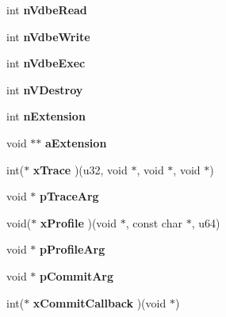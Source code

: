 \begin{DoxyCompactItemize}
\item 
\mbox{\label{structsqlite3_a321880eb620a917a0b509f5629612227}} 
int {\bfseries n\+Vdbe\+Read}
\item 
\mbox{\label{structsqlite3_aa63da8ce693d136df02033f1bdb85171}} 
int {\bfseries n\+Vdbe\+Write}
\item 
\mbox{\label{structsqlite3_a4f4a211154ba0cfbd43c57e25640dfff}} 
int {\bfseries n\+Vdbe\+Exec}
\item 
\mbox{\label{structsqlite3_adfa504e8c5d87a41e191236d0ba80f0a}} 
int {\bfseries n\+V\+Destroy}
\item 
\mbox{\label{structsqlite3_aa57fc38ef27d8fa59221cb5c0e54f7fb}} 
int {\bfseries n\+Extension}
\item 
\mbox{\label{structsqlite3_aa97954113d8e35c97f8a3af534703f7b}} 
void $\ast$$\ast$ {\bfseries a\+Extension}
\item 
\mbox{\label{structsqlite3_ad1da15bd3930c142e5cfd09c560d9e3d}} 
int($\ast$ {\bfseries x\+Trace} )(u32, void $\ast$, void $\ast$, void $\ast$)
\item 
\mbox{\label{structsqlite3_ae0920576e4e92f1b736255fcfad649d1}} 
void $\ast$ {\bfseries p\+Trace\+Arg}
\item 
\mbox{\label{structsqlite3_ab0aefde204a9c4dead89396ba929e5ca}} 
void($\ast$ {\bfseries x\+Profile} )(void $\ast$, const char $\ast$, u64)
\item 
\mbox{\label{structsqlite3_a931c234df9b701c78de38ddf22869062}} 
void $\ast$ {\bfseries p\+Profile\+Arg}
\item 
\mbox{\label{structsqlite3_a355237725d3a535d702815b6ef8be75e}} 
void $\ast$ {\bfseries p\+Commit\+Arg}
\item 
\mbox{\label{structsqlite3_aafa01826b1329161f4fd7ed9a2579a93}} 
int($\ast$ {\bfseries x\+Commit\+Callback} )(void $\ast$)
\item 
$$
\end{DoxyCompactItemize}
